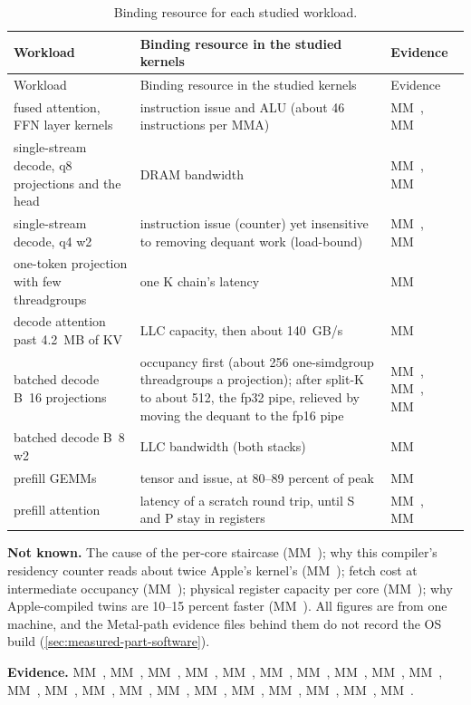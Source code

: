 \begin{xltabular}{\linewidth}{@{}X>{\hsize}X>{\hsize}X@{}}
\caption{Binding resource for each studied workload.}\label{tab:binding-resources}\\
\toprule
Workload & Binding resource in the studied kernels & Evidence \\
\midrule
\endfirsthead
{}
\toprule
Workload & Binding resource in the studied kernels & Evidence \\
\midrule
\endhead
fused attention, FFN layer kernels & instruction issue and ALU (about 46 instructions per MMA) & MM~, MM~ \\*
single-stream decode, q8 projections and the head & DRAM bandwidth & MM~, MM~ \\*
single-stream decode, q4 w2 & instruction issue (counter) yet insensitive to removing dequant work
(load-bound) & MM~, MM~ \\*
one-token projection with few threadgroups & one K chain's latency & MM~ \\*
decode attention past 4.2~MB of KV & LLC capacity, then about 140~GB/s & MM~ \\*
batched decode B~16 projections & occupancy first (about 256 one-simdgroup threadgroups a projection);
after split-K to about 512, the fp32 pipe, relieved by moving the
dequant to the fp16 pipe & MM~, MM~, MM~ \\*
batched decode B~8 w2 & LLC bandwidth (both stacks) & MM~ \\*
prefill GEMMs & tensor and issue, at 80–89 percent of peak & MM~ \\*
prefill attention & latency of a scratch round trip, until S and P stay in registers & MM~, MM~ \\*
\bottomrule
\end{xltabular}

\textbf{Not known.} The cause of the per-core staircase (MM~); why this compiler's residency counter reads
about twice Apple's kernel's (MM~); fetch cost at intermediate occupancy (MM~); physical register
capacity per core (MM~); why Apple-compiled twins are 10–15 percent faster (MM~). All figures are from one machine, and the
Metal-path evidence files behind them do not record the OS build (\cref{sec:measured-part-software}).

\textbf{Evidence.} MM~, MM~, MM~, MM~, MM~, MM~, MM~, MM~, MM~,
MM~, MM~, MM~, MM~, MM~, MM~, MM~, MM~, MM~, MM~,
MM~, MM~.
